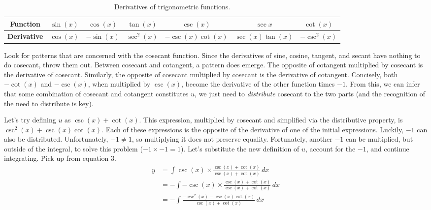 \documentclass{article}
\begin{document}
\begin{table}[h!]
    \vspace{-.7em}
    \centering
    \begin{tabular}{|c|c|c|c|c|c|c|}
        \hline
        \textbf{Function} & $\sin(x)$ & $\cos(x)$ & $\tan(x)$ & $\csc(x)$ & $\sec{x}$ & $\cot(x)$\\
        \hline
        \textbf{Derivative} & $\cos(x)$ & $-\sin(x)$ & $\sec^2(x)$ & $-\csc(x)\cot(x)$ & $\sec(x)\tan(x)$ & $-\csc^2(x)$\\
        \hline
    \end{tabular}
    \caption{Derivatives of trigonometric functions.}
    \label{tab:1}
\end{table}\par
Look for patterns that are concerned with the cosecant function. Since the derivatives of sine, cosine, tangent, and secant have nothing to do cosecant, throw them out. Between cosecant and cotangent, a pattern does emerge. The opposite of cotangent multiplied by cosecant is the derivative of cosecant. Similarly, the opposite of cosecant multiplied by cosecant is the derivative of cotangent. Concisely, both $-\cot(x)$ and $-\csc(x)$, when multiplied by $\csc(x)$, become the derivative of the other function times $-1$. From this, we can infer that some combination of cosecant and cotangent constitutes $u$, we just need to \emph{distribute} cosecant to the two parts (and the recognition of the need to distribute is key).\par
Let's try defining $u$ as $\csc(x)+\cot(x)$. This expression, multiplied by cosecant and simplified via the distributive property, is $\csc^2(x)+\csc(x)\cot(x)$. Each of these expressions is the opposite of the derivative of one of the initial expressions. Luckily, $-1$ can also be distributed. Unfortunately, $-1\neq1$, so multiplying it does not preserve equality. Fortunately, another $-1$ can be multiplied, but outside of the integral, to solve this problem ($-1\times-1=1$). Let's substitute the new definition of $u$, account for the $-1$, and continue integrating. Pick up from equation 3.
\begin{align*}
    y &= \int \csc(x)\times\frac{\csc(x)+\cot(x)}{\csc(x)+\cot(x)}\, dx\\
    &= -\int -\csc(x)\times\frac{\csc(x)+\cot(x)}{\csc(x)+\cot(x)}\, dx\\
    &= -\int \frac{-\csc^2(x)-\csc(x)\cot(x)}{\csc(x)+\cot(x)}\, dx\\
\end{align*}
\end{document}
